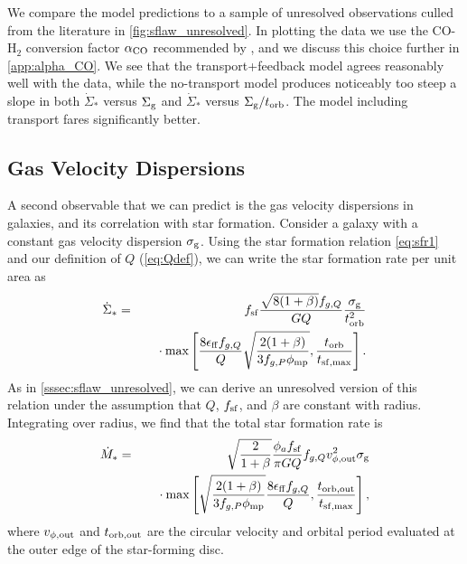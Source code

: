 \documentclass[useAMS,usenatbib]{mn2e}
\begin{document}
We compare the model predictions to a sample of unresolved observations culled from the literature in  \autoref{fig:sflaw_unresolved}. In plotting the data we use the CO-H$_2$ conversion factor $\alpha_{\rm CO}$ recommended by \citet{daddi10a}, and we discuss this choice further in \autoref{app:alpha_CO}. We see that the transport+feedback model agrees reasonably well with the data, while the no-transport model produces noticeably too steep a slope in both $\dot{\Sigma}_*$ versus $\Sigma_{\rm g}$ and $\dot{\Sigma}_*$ versus $\Sigma_{\rm g}/t_{\rm orb}$. The model including transport fares significantly better.


\subsection{Gas Velocity Dispersions}
\label{ssec:sfr_vdisp}

A second observable that we can predict is the gas velocity dispersions in galaxies, and its correlation with star formation. Consider a galaxy with a constant gas velocity dispersion $\sigma_{\rm g}$. Using the star formation relation \autoref{eq:sfr1} and our definition of $Q$ (\autoref{eq:Qdef}), we can write the star formation rate per unit area as
\begin{eqnarray}
\dot{\Sigma}_* & = & f_{\rm sf} \frac{\sqrt{8(1+\beta)} f_{g,Q}}{G Q} \frac{\sigma_{\rm g}}{t_{\rm orb}^2}
\nonumber \\
& & 
\quad {} \cdot
\max \left[\frac{8\epsilon_{\rm ff} f_{g,Q}}{Q} \sqrt{\frac{2(1+\beta)}{3f_{g,P} \phi_{\rm mp}}}, \frac{t_{\rm orb}}{t_{\rm sf,max}}\right].
\label{eq:sigma_sfr_obs}
\end{eqnarray}
As in \autoref{sssec:sflaw_unresolved}, we can derive an unresolved version of this relation under the assumption that $Q$, $f_{\rm sf}$, and $\beta$ are constant with radius. Integrating over radius, we find that the total star formation rate is
\begin{eqnarray}
\dot{M}_* & = & 
\sqrt{\frac{2}{1+\beta}} \frac{\phi_a f_{\rm sf}}{\pi G Q} f_{g,Q} v_{\phi,\rm out}^2 \sigma_{\rm g}
\nonumber \\
& &
\quad {} \cdot
\max\left[
\sqrt{\frac{2(1+\beta)}{3 f_{g,P} \phi_{\rm mp}}} \frac{8 \epsilon_{\rm ff} f_{g,Q}}{Q},
\frac{t_{\rm orb,out}}{t_{\rm sf,max}}
\right],
\label{eq:sigma_sfr_unresolved}
\end{eqnarray}
where $v_{\phi,\rm out}$ and $t_{\rm orb,out}$ are the circular velocity and orbital period evaluated at the outer edge of the star-forming disc. 
\end{document}
